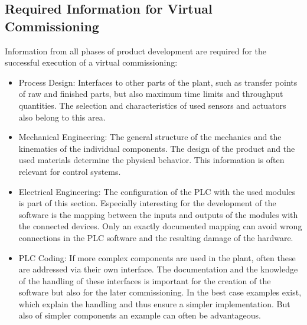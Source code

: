 \subsection{Required Information for Virtual Commissioning}   \label{sec:DataForVirtualCommissioning}
	Information from all phases of product development are required for the successful execution of a virtual commissioning: 
	\begin{itemize}
		\item Process Design: Interfaces to other parts of the plant, such as transfer points of raw and finished parts, but also maximum time limits and throughput quantities. The selection and characteristics of used sensors and actuators also belong to this area.
		
		\item Mechanical Engineering: The general structure of the mechanics and the kinematics of the individual components. The design of the product and the used materials determine the physical behavior. This information is often relevant for control systems. 
		
		\item Electrical Engineering: The configuration of the PLC with the used modules is part of this section. Especially interesting for the development of the software is the mapping between the inputs and outputs of the modules with the connected devices. Only an exactly documented mapping can avoid wrong connections in the PLC software and the resulting damage of the hardware.
		
		\item PLC Coding: If more complex components are used in the plant, often these are addressed via their own interface. The documentation and the knowledge of the handling of these interfaces is important for the creation of the software but also for the later commissioning. In the best case examples exist, which explain the handling and thus ensure a simpler implementation. But also of simpler components an example can often be advantageous. 
	\end{itemize}
